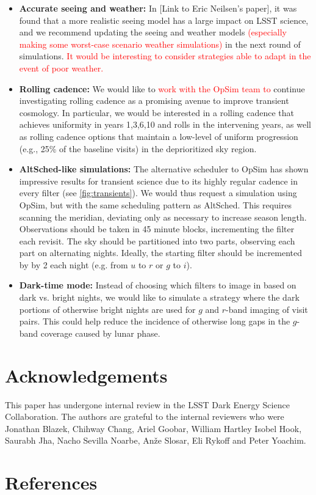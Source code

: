 \documentclass[12pt, letterpaper]{article}
\newcommand{\review}[1]{{\textcolor{red}{#1}}}
\begin{document}
\begin{itemize}
    \item{\bfseries Accurate seeing and weather:} In [Link to Eric Neilsen's paper], it was found that a more realistic seeing model has a large impact on LSST science, 
    and we recommend updating the seeing and weather models \review{(especially making some worst-case scenario weather simulations)} in the next round of simulations. \review{It would be interesting to consider strategies able to adapt in the event of poor weather.}
    
    \item{\bfseries Rolling cadence:} We would like to \review{work with the OpSim team to} continue investigating rolling cadence as a promising avenue to improve transient cosmology. In particular, we would be interested in a rolling cadence that achieves uniformity in years 1,3,6,10 and rolls in the intervening years, as well as rolling cadence options that maintain a low-level of uniform progression (e.g., 25\% of the baseline visits) in the deprioritized sky region.
    
    \item{\bfseries AltSched-like simulations:} The alternative scheduler to OpSim has shown impressive results for transient science due to its highly regular cadence in every filter (see \autoref{fig:transients}). We would thus request a simulation using OpSim, but with the same scheduling pattern as AltSched. This requires scanning the meridian, deviating only as necessary to increase season length. Observations should be taken in 45 minute blocks, incrementing the filter each revisit. The sky should be partitioned into two parts, observing each part on alternating nights. Ideally, the starting filter should be incremented by by 2 each night (e.g. from $u$ to $r$ or $g$ to $i$). 
    
    \item{\bfseries Dark-time mode:}  Instead of choosing which filters to image in based on dark vs. bright nights, we would like to simulate a strategy where the dark portions of otherwise bright nights are used for $g$ and $r$-band imaging of visit pairs.  This could help reduce the incidence of otherwise long gaps in the $g$-band coverage caused by lunar phase.  
    
\end{itemize}
\section{Acknowledgements}
 \begin{footnotesize}
This paper has undergone internal review in the LSST Dark Energy Science Collaboration. The authors are grateful to the internal reviewers who were Jonathan Blazek, Chihway Chang, Ariel Goobar, William Hartley Isobel Hook, Saurabh Jha, Nacho Sevilla Noarbe, Anže Slosar, Eli Rykoff and Peter Yoachim. 
 \end{footnotesize}
\section{References}

\begingroup
\renewcommand{\section}[2]{}%

\endgroup
\end{document}
